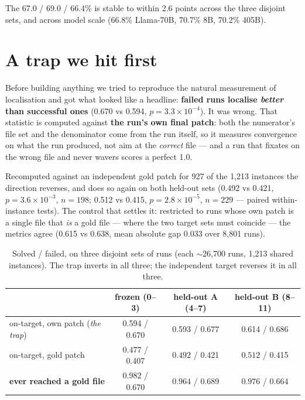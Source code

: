 \documentclass[10pt]{article}
\begin{document}
\noindent The 67.0 / 69.0 / 66.4\% is stable to within 2.6 points across the three disjoint sets, and
across model scale (66.8\% Llama-70B, 70.7\% 8B, 70.2\% 405B).

\section{A trap we hit first}

Before building anything we tried to reproduce the natural measurement of localisation and got what
looked like a headline: \textbf{failed runs localise \emph{better} than successful ones}
(0.670 vs 0.594, $p=3.3\times10^{-4}$). It was wrong. That statistic is computed against
\textbf{the run's own final patch}: both the numerator's file set and the denominator come from the
run itself, so it measures convergence on what the run produced, not aim at the \emph{correct} file
--- and a run that fixates on the wrong file and never wavers scores a perfect 1.0.

Recomputed against an independent gold patch for 927 of the 1{,}213 instances the direction
reverses, and does so again on both held-out sets (0.492 vs 0.421, $p=3.6\times10^{-3}$, $n=198$;
0.512 vs 0.415, $p=2.8\times10^{-5}$, $n=229$ --- paired within-instance tests). The control that
settles it: restricted to runs whose own patch is a single file that \emph{is} a gold file --- where
the two target sets must coincide --- the metrics agree (0.615 vs 0.638, mean absolute gap 0.033 over
8{,}801 runs).

\begin{table}[h]
\centering\small
\begin{tabular}{lccc}
\toprule
& frozen (0--3) & held-out A (4--7) & held-out B (8--11) \\
\midrule
on-target, own patch (\emph{the trap}) & 0.594 / $\mathbf{0.670}$ & 0.593 / $\mathbf{0.677}$ & 0.614 / $\mathbf{0.686}$ \\
on-target, gold patch & $\mathbf{0.477}$ / 0.407 & $\mathbf{0.492}$ / 0.421 & $\mathbf{0.512}$ / 0.415 \\
\textbf{ever reached a gold file} & $\mathbf{0.982}$ / 0.670 & $\mathbf{0.964}$ / 0.689 & $\mathbf{0.976}$ / 0.664 \\
\bottomrule
\end{tabular}
\caption{Solved / failed, on three disjoint sets of runs (each $\sim$26{,}700 runs, 1{,}213 shared
instances). The trap inverts in all three; the independent target reverses it in all three.}
\end{table}
\end{document}
